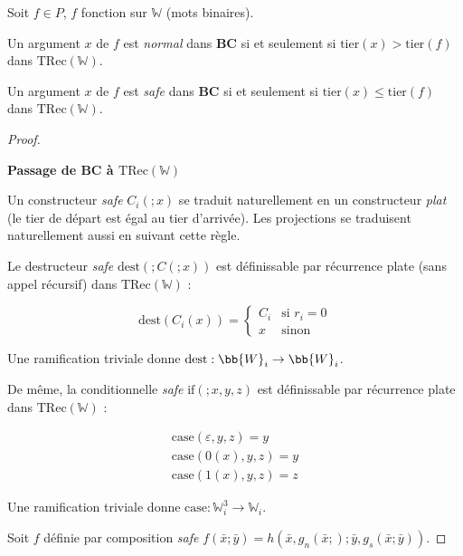\documentclass{report}
\newcommand{\TRec}[1]{\text{TRec}\left(\mathbb{#1}\right)}
\begin{document}
			\begin{lemma}
				\label{lem:BC_and_Leivant}
				Soit $f \in P$, $f$ fonction sur $\mathbb{W}$ (mots binaires).
				
				Un argument $x$ de $f$ est \emph{normal} dans $\textbf{BC}$ si et seulement si $\text{tier}(x) > \text{tier}(f)$ dans $\TRec{W}$.
				
				Un argument $x$ de $f$ est \emph{safe} dans $\textbf{BC}$ si et seulement si $\text{tier}(x) \leq \text{tier}(f)$ dans $\TRec{W}$.
			\end{lemma}
			
			\begin{proof}
				\textcolor{white}{T} %
				
				\textbf{Passage de $\textbf{BC}$ à $\TRec{W}$}
				
				Un constructeur \emph{safe} $C_i(; x)$ se traduit naturellement en un constructeur \emph{plat} (le tier de départ est égal au tier d'arrivée). Les projections se traduisent naturellement aussi en suivant cette règle.
				
				Le destructeur \emph{safe} $\text{dest} \left( ; C\left(; x\right) \right)$ est définissable par récurrence plate (sans appel récursif) dans $\TRec{W}$ : 
				
				\[
					\text{dest} \left( C_i\left( x\right) \right) = 
					\left\lbrace \begin{array}{ll}
					C_i	& \text{si $r_i = 0$} \\
					x	& \text{sinon}
					\end{array} \right.
				\]
				
				Une ramification triviale donne $\text{dest} : \bb{W}_i \to \bb{W}_i$.
				
				De même, la conditionnelle \emph{safe} $\text{if} \left( ; x, y, z\right)$ est définissable par récurrence plate dans $\TRec{W}$ : 
				
				\[
					\begin{array}{l}
					\text{case}(\varepsilon, y, z) = y \\
					\text{case}(0(x), y, z) = y \\
					\text{case}(1(x), y, z) = z
					\end{array}
				\]
				
				Une ramification triviale donne $\text{case} : \mathbb{W}_i^3 \to \mathbb{W}_i$.
				
				Soit $f$ définie par composition \emph{safe} $f\left( \bar{x} ; \bar{y}\right) = h\left( \bar{x}, g_n( \bar{x}; ) ; \bar{y}, g_s( \bar{x}; \bar{y} ) \right)$.
				

\end{proof}
\end{document}
